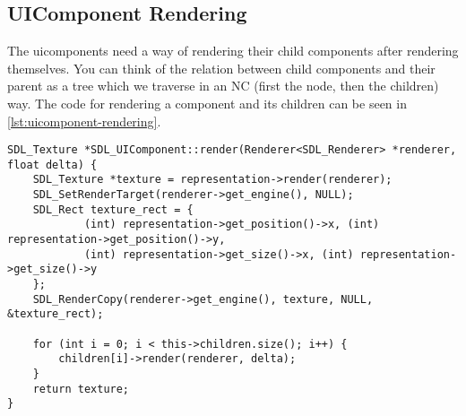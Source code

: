 \subsection{UIComponent Rendering}
\label{sec:rendering-ui}

The uicomponents need a way of rendering their child components after 
rendering themselves. You can think of the relation between child components 
and their parent as a tree which we traverse in an NC (first the node, then 
the children) way. The code for rendering a component and its children can be 
seen in \cref{lst:uicomponent-rendering}.
\\
\begin{lstlisting}[caption={UIComponent rendering.},
label={lst:uicomponent-rendering}]
SDL_Texture *SDL_UIComponent::render(Renderer<SDL_Renderer> *renderer, float delta) {
    SDL_Texture *texture = representation->render(renderer);
    SDL_SetRenderTarget(renderer->get_engine(), NULL);
    SDL_Rect texture_rect = {
            (int) representation->get_position()->x, (int) representation->get_position()->y,
            (int) representation->get_size()->x, (int) representation->get_size()->y
    };
    SDL_RenderCopy(renderer->get_engine(), texture, NULL, &texture_rect);

    for (int i = 0; i < this->children.size(); i++) {
        children[i]->render(renderer, delta);
    }
    return texture;
}
\end{lstlisting}
